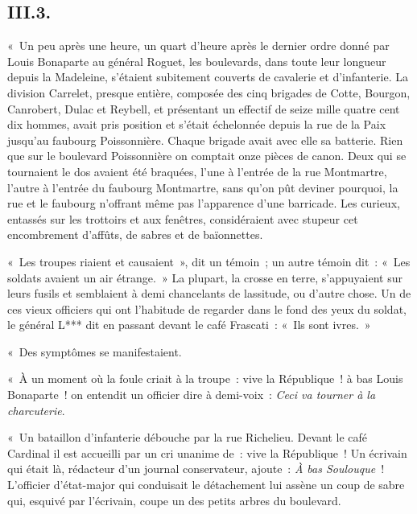 \documentclass[french,twoside]{book} %
\begin{document}
\subsection[{III.3.}]{III.3.}
\noindent « Un peu après une heure, un quart d’heure après le dernier ordre donné par Louis Bonaparte au général Roguet, les boulevards, dans toute leur longueur depuis la Madeleine, s’étaient subitement couverts de cavalerie et d’infanterie. La division Carrelet, presque entière, composée des cinq brigades de Cotte, Bourgon, Canrobert, Dulac et Reybell, et présentant un effectif de seize mille quatre cent dix hommes, avait pris position et s’était échelonnée depuis la rue de la Paix jusqu’au faubourg Poissonnière. Chaque brigade avait avec elle sa batterie. Rien que sur le boulevard Poissonnière on comptait onze pièces de canon. Deux qui se tournaient le dos avaient été braquées, l’une à l’entrée de la rue Montmartre, l’autre à l’entrée du faubourg Montmartre, sans qu’on pût deviner pourquoi, la rue et le faubourg n’offrant même pas l’apparence d’une barricade. Les curieux, entassés sur les trottoirs et aux fenêtres, considéraient avec stupeur cet encombrement d’affûts, de sabres et de baïonnettes.\par
« Les troupes riaient et causaient », dit un témoin ; un autre témoin dit : « Les soldats avaient un air étrange. » La plupart, la crosse en terre, s’appuyaient sur leurs fusils et semblaient à demi chancelants de lassitude, ou d’autre chose. Un de ces vieux officiers qui ont l’habitude de regarder dans le fond des yeux du soldat, le général L*** dit en passant devant le café Frascati : « Ils sont ivres. »\par
« Des symptômes se manifestaient.\par
« À un moment où la foule criait à la troupe : vive la République ! à bas Louis Bonaparte ! on entendit un officier dire à demi-voix : \emph{Ceci va tourner à la charcuterie}.\par
« Un bataillon d’infanterie débouche par la rue Richelieu. Devant le café Cardinal il est accueilli par un cri unanime de : vive la République ! Un écrivain qui était là, rédacteur d’un journal conservateur, ajoute : \emph{À bas Soulouque} ! L’officier d’état-major qui conduisait le détachement lui assène un coup de sabre qui, esquivé par l’écrivain, coupe un des petits arbres du boulevard.\par
\end{document}
